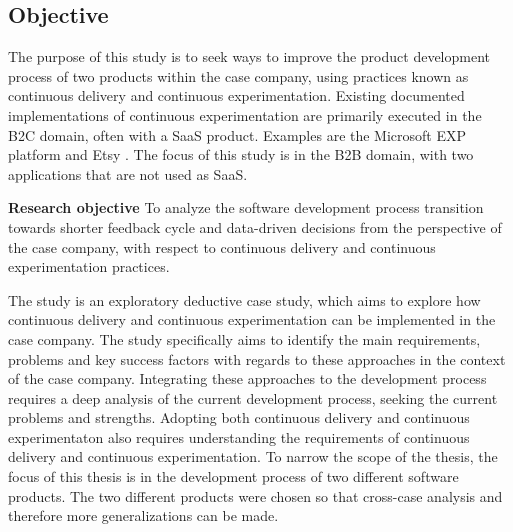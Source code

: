 \documentclass[english]{tktltiki2}
\theoremstyle{definition}
\theoremstyle{remark}
\begin{document}

\subsection{Objective} %
The purpose of this study is to seek ways to improve the product development process of two products within the case company, using practices known as continuous delivery and continuous experimentation. Existing documented implementations of continuous experimentation are primarily executed in the B2C domain, often with a SaaS product. Examples are the Microsoft EXP platform \cite{ep} and Etsy \cite{}. The focus of this study is in the B2B domain, with two applications that are not used as SaaS. 

\bigskip
\noindent \textbf{Research objective}
To analyze the software development process transition towards shorter feedback cycle and data-driven decisions from the perspective of the case company, with respect to continuous delivery and continuous experimentation practices.

The study is an exploratory deductive case study, which aims to explore how continuous delivery and continuous experimentation can be implemented in the case company. The study specifically aims to identify the main requirements, problems and key success factors with regards to these approaches in the context of the case company. Integrating these approaches to the development process requires a deep analysis of the current development process, seeking the current problems and strengths. Adopting both continuous delivery and continuous experimentaton also requires understanding the requirements of continuous delivery and continuous experimentation. To narrow the scope of the thesis, the focus of this thesis is in the development process of two different software products. The two different products were chosen so that cross-case analysis and therefore more generalizations can be made.
\end{document}
